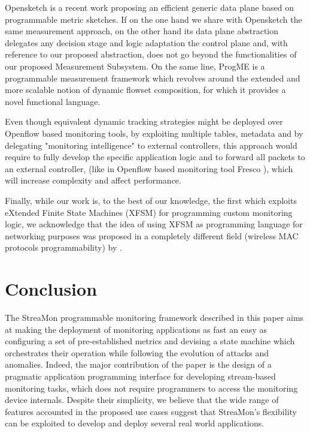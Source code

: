 \documentclass[conference,letterpaper]{sig-alternate-10pt}
\begin{document}
Opensketch \cite{opensk} is a recent work proposing an efficient generic data plane based on programmable 
metric sketches. If on the one hand we share with Opensketch the same measurement approach, on the other 
hand its data plane abstraction delegates any decision stage and logic adaptation the control plane and, with 
reference to our proposed abstraction, does not go beyond the functionalities of our proposed Measurement 
Subsystem. On the same line, ProgME \cite{progme} is a programmable measurement framework which revolves 
around the extended and more scalable notion of dynamic flowset composition, for which it provides 
a novel functional language. 

Even though equivalent dynamic tracking strategies might be deployed over Openflow based monitoring tools, 
by exploiting multiple tables, metadata and by delegating "monitoring intelligence"  to external controllers, this 
approach would require to fully develop the specific application logic and to forward all packets to an external 
controller, (like in Openflow based monitoring tool Fresco \cite{fresco}), which will increase complexity 
and affect performance.

Finally, while our work is, to the best of our knowledge, the first which exploits eXtended Finite State Machines 
(XFSM) for programming custom monitoring logic, we acknowledge that the idea of using XFSM as programming language for networking purposes was proposed in a completely different field (wireless MAC protocols programmability) by \cite{bia12}.





\section{Conclusion}
\label{s:conclusion}
The StreaMon programmable monitoring framework described in this paper aims at making the deployment of monitoring applications as fast an easy as configuring a set of pre-established metrics and devising a state machine which orchestrates their operation while following the evolution of attacks and anomalies. Indeed, the major contribution of the paper is the design of a pragmatic application programming interface for developing stream-based monitoring tasks, which does not require programmers to access the monitoring device internals.  Despite their simplicity, we believe that the wide range of features accounted in the proposed use cases suggest that StreaMon's flexibility can be exploited to develop and deploy several real world applications. 







\footnotesize


\end{document}
